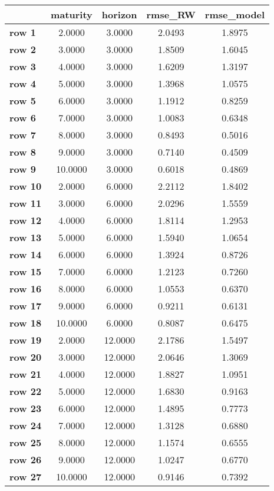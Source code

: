 \begin{tiny}\begin{tabular}{|l|c|c|c|c|}
\hline
&\textbf{maturity}&\textbf{horizon}&\textbf{rmse_RW}&\textbf{rmse_model}\\\hline
\textbf{row 1}&2.0000&3.0000&2.0493&1.8975\\\hline
\textbf{row 2}&3.0000&3.0000&1.8509&1.6045\\\hline
\textbf{row 3}&4.0000&3.0000&1.6209&1.3197\\\hline
\textbf{row 4}&5.0000&3.0000&1.3968&1.0575\\\hline
\textbf{row 5}&6.0000&3.0000&1.1912&0.8259\\\hline
\textbf{row 6}&7.0000&3.0000&1.0083&0.6348\\\hline
\textbf{row 7}&8.0000&3.0000&0.8493&0.5016\\\hline
\textbf{row 8}&9.0000&3.0000&0.7140&0.4509\\\hline
\textbf{row 9}&10.0000&3.0000&0.6018&0.4869\\\hline
\textbf{row 10}&2.0000&6.0000&2.2112&1.8402\\\hline
\textbf{row 11}&3.0000&6.0000&2.0296&1.5559\\\hline
\textbf{row 12}&4.0000&6.0000&1.8114&1.2953\\\hline
\textbf{row 13}&5.0000&6.0000&1.5940&1.0654\\\hline
\textbf{row 14}&6.0000&6.0000&1.3924&0.8726\\\hline
\textbf{row 15}&7.0000&6.0000&1.2123&0.7260\\\hline
\textbf{row 16}&8.0000&6.0000&1.0553&0.6370\\\hline
\textbf{row 17}&9.0000&6.0000&0.9211&0.6131\\\hline
\textbf{row 18}&10.0000&6.0000&0.8087&0.6475\\\hline
\textbf{row 19}&2.0000&12.0000&2.1786&1.5497\\\hline
\textbf{row 20}&3.0000&12.0000&2.0646&1.3069\\\hline
\textbf{row 21}&4.0000&12.0000&1.8827&1.0951\\\hline
\textbf{row 22}&5.0000&12.0000&1.6830&0.9163\\\hline
\textbf{row 23}&6.0000&12.0000&1.4895&0.7773\\\hline
\textbf{row 24}&7.0000&12.0000&1.3128&0.6880\\\hline
\textbf{row 25}&8.0000&12.0000&1.1574&0.6555\\\hline
\textbf{row 26}&9.0000&12.0000&1.0247&0.6770\\\hline
\textbf{row 27}&10.0000&12.0000&0.9146&0.7392\\\hline
\end{tabular}
\end{tiny}